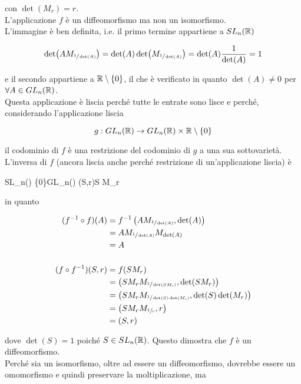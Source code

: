 con $ \det(M_{r}) = r $.\\
L'applicazione $ f $ è un diffeomorfismo ma non un isomorfismo.\\
L'immagine è ben definita, i.e. il primo termine appartiene a $ SL_{n}(\mathbb{R}) $

\begin{equation}
	\det(A M_{\sfrac{1}{\det(A)}}) = \det(A) \det(M_{\sfrac{1}{\det(A)}}) = \det(A) \dfrac{1}{\det(A)} = 1
\end{equation}

e il secondo appartiene a $ \mathbb{R} \setminus \{0\} $, il che è verificato in quanto $ \det(A) \neq 0 $ per $ \forall A \in GL_{n}(\mathbb{R}) $.\\
Questa applicazione è liscia perché tutte le entrate sono lisce e perché, considerando l'applicazione liscia

\begin{equation}
	g : GL_{n}(\mathbb{R}) \to GL_{n}(\mathbb{R}) \times \mathbb{R} \setminus \{0\}
\end{equation}
 
il codominio di $ f $ è una restrizione del codominio di $ g $ a una sua sottovarietà.\\
L'inversa di $ f $ (ancora liscia anche perché restrizione di un'applicazione liscia) è

%
	{SL_{n}(\R) \times \R \setminus \{0\}}{GL_{n}(\R)}%
	{(S,r)}{S M_{r}}

in quanto

\begin{align}
	\begin{split}
		(f^{-1} \circ f)(A) &= f^{-1} \left( A M_{\sfrac{1}{\det(A)}},\det(A) \right)\\
		&= A M_{\sfrac{1}{\det(A)}} M_{\det(A)}\\
		&= A\\\\
		(f \circ f^{-1})(S,r) &= f(S M_{r})\\
		&= \left( S M_{r} M_{\sfrac{1}{\det(S M_{r})}},\det(S M_{r}) \right)\\
		&= \left( S M_{r} M_{\sfrac{1}{\det(S) \det(M_{r})}},\det(S) \det(M_{r}) \right)\\
		&= \left( S M_{r} M_{\sfrac{1}{r}},r \right)\\
		&= (S,r)
	\end{split}
\end{align}

dove $ \det(S) = 1 $ poiché $ S \in SL_{n} (\mathbb{R}) $. Questo dimostra che $ f $ è un diffeomorfismo.\\
Perché sia un isomorfismo, oltre ad essere un diffeomorfismo, dovrebbe essere un omomorfismo e quindi preservare la moltiplicazione, ma

